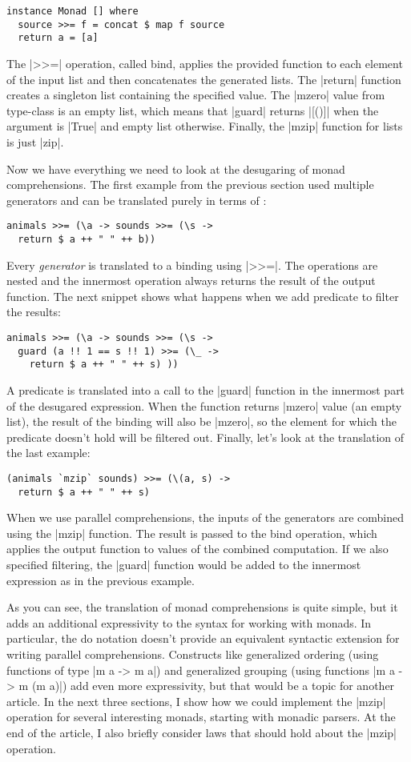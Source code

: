 \documentclass{tmr}
\begin{document}
\begin{verbatim}
instance Monad [] where
  source >>= f = concat $ map f source
  return a = [a]
\end{verbatim}
The |>>=| operation, called bind, applies the provided function to each element of the input list 
and then concatenates the generated lists. The |return| function creates a singleton list containing 
the specified value. The |mzero| value from  type-class is an empty list, which 
means that |guard| returns |[()]| when the argument is |True| and empty list otherwise. Finally,
the |mzip| function for lists is just |zip|.

Now we have everything we need to look at the desugaring of monad comprehensions. The first
example from the previous section used multiple generators and can be translated purely in terms
of :

\begin{verbatim}
animals >>= (\a -> sounds >>= (\s -> 
  return $ a ++ " " ++ b))
\end{verbatim}
Every \textit{generator} is translated to a binding using |>>=|. The operations are nested and
the innermost operation always returns the result of the output function. The next snippet shows
what happens when we add predicate to filter the results:

\begin{verbatim}
animals >>= (\a -> sounds >>= (\s -> 
  guard (a !! 1 == s !! 1) >>= (\_ -> 
    return $ a ++ " " ++ s) ))
\end{verbatim}
A predicate is translated into a call to the |guard| function in the innermost part of the 
desugared expression. When the function returns |mzero| value (an empty list), the result of the
binding will also be |mzero|, so the element for which the predicate doesn't hold will be 
filtered out. Finally, let's look at the translation of the last example:

\begin{verbatim}
(animals `mzip` sounds) >>= (\(a, s) -> 
  return $ a ++ " " ++ s)
\end{verbatim}
When we use parallel comprehensions, the inputs of the generators are combined using the |mzip|
function. The result is passed to the bind operation, which applies the output function to values
of the combined computation. If we also specified filtering, the |guard| function would be added 
to the innermost expression as in the previous example.

As you can see, the translation of monad comprehensions is quite simple, but it adds an additional
expressivity to the syntax for working with monads. In particular, the do notation doesn't provide
an equivalent syntactic extension for writing parallel comprehensions. Constructs like generalized 
ordering (using functions of type |m a -> m a|) and generalized grouping (using functions 
|m a -> m (m a)|) add even more expressivity, but that would be a topic for another article. 
In the next three sections, I show how we could implement the |mzip| operation for several 
interesting monads, starting with monadic parsers. At the end of the article, I also briefly 
consider laws that should hold about the |mzip| operation.
\end{document}
